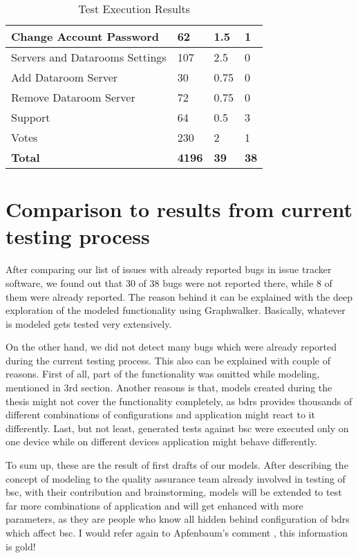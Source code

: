 \begin{table}[]
\begin{tabular}{|l|p{2cm}|p{2cm}|p{2cm}|}
        Change Account Password & 62 & 1.5 & 1 \\
        \hline
        Servers and Datarooms Settings & 107 & 2.5 & 0 \\
        \hline
        Add Dataroom Server & 30 & 0.75 & 0 \\
        \hline
        Remove Dataroom Server & 72 & 0.75 & 0 \\
        \hline
        Support & 64 & 0.5 & 3 \\
        \hline
        Votes & 230 & 2 & 1 \\
        \hline
        \textbf{Total} & \textbf{4196} & \textbf{39} & \textbf{38}\\
        \hline
    \end{tabular}
    \caption{Test Execution Results }
    \label{tab:Test_Results}
\end{table}

\section{Comparison to results from current testing process}

\par
After comparing our list of issues with already reported bugs in issue tracker software, we found out that 30 of 38 bugs were not reported there, while 8 of them were already reported. The reason behind it can be explained with the deep exploration of the modeled functionality using Graphwalker. Basically, whatever is modeled gets tested very extensively.

\par
On the other hand, we did not detect many bugs which were already reported during the current testing process. This also can be explained with couple of reasons. First of all, part of the functionality was omitted while modeling, mentioned in 3rd section. Another reasons is that, models created during the thesis might not cover the functionality completely, as \acrshort{bdrs} provides thousands of different combinations of configurations and application might react to it differently. Last, but not least, generated tests against \acrshort{bsc} were executed only on one device while on different devices application might behave differently.

\par
To sum up, these are the result of first drafts of our models. After describing the concept of modeling to the quality assurance team already involved in testing of \acrshort{bsc}, with their contribution and brainstorming, models will be extended to test far more combinations of application and will get enhanced with more parameters, as they are people who know all hidden behind configuration of \acrshort{bdrs} which affect \acrshort{bsc}. I would refer again to Apfenbaum's comment \cite{Apfenbaum_MBT}, this information is gold!
